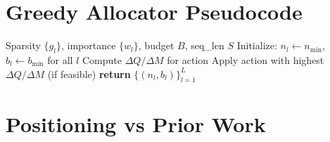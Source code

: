\documentclass{article}
\newcommand{\nlayers}{L}
\begin{document}



\appendix

\section{Greedy Allocator Pseudocode}
\label{app:algorithm}

\begin{algorithm}[h]
\caption{LayerBudget Greedy Allocation}
\label{alg:allocation}
\begin{algorithmic}[1]
\REQUIRE Sparsity $\{g_l\}$, importance $\{w_l\}$, budget $B$, seq\_len $S$
\STATE Initialize: $n_l \leftarrow n_{\min}$, $b_l \leftarrow b_{\min}$ for all $l$
        \STATE Compute $\Delta Q / \Delta M$ for action
    \ENDFOR
    \STATE Apply action with highest $\Delta Q / \Delta M$ (if feasible)
\ENDWHILE
\STATE \textbf{return} $\{(n_l, b_l)\}_{l=1}^{\nlayers}$
\end{algorithmic}
\end{algorithm}

\section{Positioning vs Prior Work}
\label{app:positioning}
\end{document}
